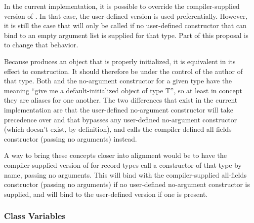 In the current implementation, it is possible to override the compiler-supplied version of
.  In that case, the user-defined version is used preferentially.
However, it is still the case that  will only be called if no
user-defined constructor that can bind to an empty argument list is supplied for that
type.  Part of this proposal is to change that behavior.

Because  produces an object that is properly initialized, it is
equivalent in its effect to construction.  It should therefore be under the control of the
author of that type.  Both  and the no-argument constructor for a given
type have the meaning ``give me a default-initialized object of type T'', so at least in
concept they are aliases for one another.  The two differences that exist in the current
implementation are that the user-defined no-argument constructor will take precedence over
 and that  bypasses any user-defined no-argument
constructor (which doesn't exist, by definition), and calls the compiler-defined
all-fields constructor (passing no arguments) instead.  

A way to bring these concepts
closer into alignment would be to have the compiler-supplied version of
 for record types call a constructor of that type by name, passing no
arguments.  This will bind with the compiler-supplied all-fields constructor (passing no
arguments) if no user-defined no-argument constructor is supplied, and will bind to the
user-defined version if one is present.

\subsubsection{Class Variables}

